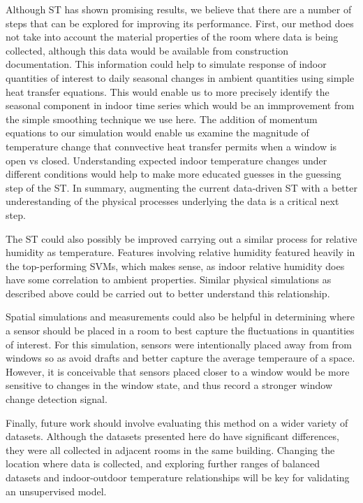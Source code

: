 \documentclass[sigconf]{acmart}
\begin{document}
Although ST has shown promising results, we believe that there are a
number of steps that can be explored for improving its performance.
First, our method does not take into account the material properties of
the room where data is being collected, although this data would be
available from construction documentation. This information could help
to simulate response of indoor quantities of interest to daily seasonal
changes in ambient quantities using simple heat transfer equations. This
would enable us to more precisely identify the seasonal component in
indoor time series which would be an immprovement from the simple
smoothing technique we use here. The addition of momentum equations to
our simulation would enable us examine the magnitude of temperature
change that connvective heat transfer permits when a window is open vs
closed. Understanding expected indoor temperature changes under
different conditions would help to make more educated guesses in the
guessing step of the ST. In summary, augmenting the current data-driven
ST with a better underestanding of the physical processes underlying the
data is a critical next step.

The ST could also possibly be improved carrying out a similar process
for relative humidity as temperature. Features involving relative
humidity featured heavily in the top-performing SVMs, which makes sense,
as indoor relative humidity does have some correlation to ambient
properties. Similar physical simulations as described above could be
carried out to better understand this relationship.

Spatial simulations and measurements could also be helpful in
determining where a sensor should be placed in a room to best capture
the fluctuations in quantities of interest. For this simulation, sensors
were intentionally placed away from from windows so as avoid drafts and
better capture the average temperaure of a space. However, it is
conceivable that sensors placed closer to a window would be more
sensitive to changes in the window state, and thus record a stronger
window change detection signal.

Finally, future work should involve evaluating this method on a wider
variety of datasets. Although the datasets presented here do have
significant differences, they were all collected in adjacent rooms in
the same building. Changing the location where data is collected, and
exploring further ranges of balanced datasets and indoor-outdoor
temperature relationships will be key for validating an unsupervised
model.
\end{document}
